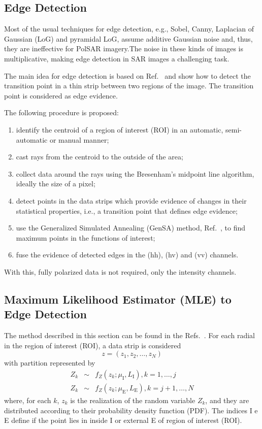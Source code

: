 \documentclass[journal]{IEEEtran}
\begin{document}
\subsection{Edge Detection}

Most of the usual techniques for edge detection, e.g., 
Sobel, Canny, Laplacian of Gaussian (LoG) and pyramidal LoG, assume additive Gaussian noise and, thus, they are ineffective for PolSAR imagery.The noise in these kinds of images is multiplicative, making edge detection in SAR images a challenging task.

The main idea for edge detection is based on Ref.~\cite{nhfc, gmbf} and show how to detect the transition point in a thin strip between two regions of the image. The transition point is considered as edge evidence. 

The following procedure is proposed:
\begin{enumerate}
	\item identify the centroid of a region of interest (ROI) in an automatic, semi-automatic or manual manner;
	\item cast rays from the centroid to the outside of the area;
	\item collect data around the rays using the  Bresenham's midpoint line algorithm, ideally the size of a pixel;
	\item detect points in the data strips which provide evidence of changes in their statistical properties, i.e., a transition point that defines edge evidence;
	\item use the Generalized Simulated Annealing (GenSA) method, Ref.~\cite{xgsh}, to find maximum points in the functions of interest;
	\item fuse the evidence of detected edges in the (hh), (hv) and (vv) channels.
\end{enumerate}
With this, fully polarized data is not required, only the intensity channels.

\subsection{Maximum Likelihood Estimator (MLE) to Edge Detection}

The method described in this section can be found in the Refs.~\cite{gmbf,nhfc}. For each radial in the region of interest (ROI), a data strip is considered
\begin{equation}\nonumber
	z = (z_1,z_2,\dots,z_N)
\end{equation}
with partition represented by
\begin{equation}\label{func_max_ver_uni_gamma} 
\begin{array}{lll}
	Z_k&\sim& f_Z(z_k;\mu_\text{I},L_\text{I}), k=1,\dots,j\\
	Z_k&\sim& f_Z(z_k;\mu_\text{E},L_\text{E}), k=j+1,\dots,N
\end{array}
\end{equation}
where, for each $k$, $z_k$ is the realization of the random variable $Z_k$, and they are distributed according to their probability density function (PDF). The indices I e E define if the point lies in inside I or external E of region of interest (ROI).
\end{document}
